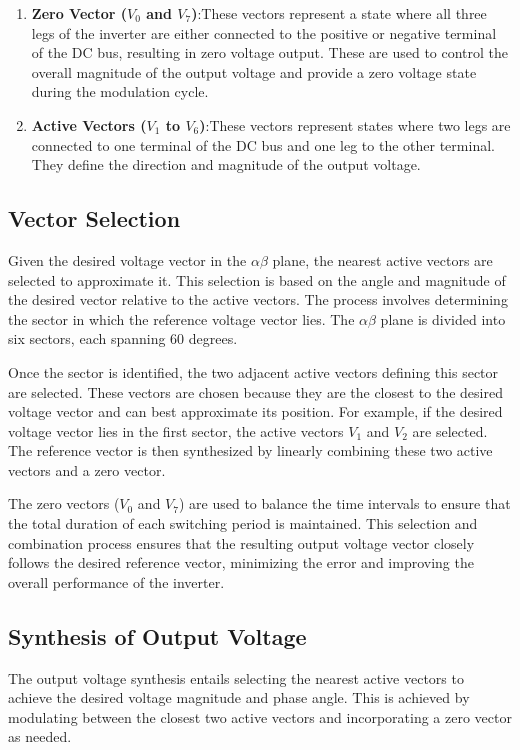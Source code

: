 \begin{enumerate}
    \item \textbf{Zero Vector ($V_0$ and $V_7$)}:These vectors represent a state where all three legs of the inverter are either connected to the positive or negative terminal of the DC bus, resulting in zero voltage output. These are used to control the overall magnitude of the output voltage and provide a zero voltage state during the modulation cycle.
    \item \textbf{Active Vectors ($V_1$ to $V_6$)}:These vectors represent states where two legs are connected to one terminal of the DC bus and one leg to the other terminal. They define the direction and magnitude of the output voltage.
\end{enumerate}

\subsection{Vector Selection}
Given the desired voltage vector in the $\alpha\beta$ plane, the nearest active
vectors are selected to approximate it. This selection is based on the angle
and magnitude of the desired vector relative to the active vectors. The process
involves determining the sector in which the reference voltage vector lies. The
$\alpha\beta$ plane is divided into six sectors, each spanning 60 degrees.

Once the sector is identified, the two adjacent active vectors defining this
sector are selected. These vectors are chosen because they are the closest to
the desired voltage vector and can best approximate its position. For example,
if the desired voltage vector lies in the first sector, the active vectors
$V_1$ and $V_2$ are selected. The reference vector is then synthesized by
linearly combining these two active vectors and a zero vector.

The zero vectors ($V_0$ and $V_7$) are used to balance the time intervals to
ensure that the total duration of each switching period is maintained. This
selection and combination process ensures that the resulting output voltage
vector closely follows the desired reference vector, minimizing the error and
improving the overall performance of the inverter.

\subsection{Synthesis of Output Voltage}
The output voltage synthesis entails selecting the nearest active vectors to
achieve the desired voltage magnitude and phase angle. This is achieved by
modulating between the closest two active vectors and incorporating a zero
vector as needed.


